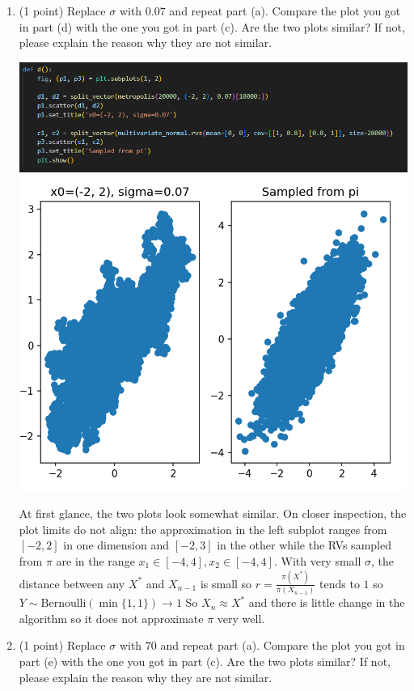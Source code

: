 \documentclass[11pt,letterpaper, leqno]{article}
\numberwithin{equation}{section}
\numberwithin{theorem}{section}
\numberwithin{lemma}{section}
\numberwithin{corollary}{section}
\numberwithin{definition}{section}
\numberwithin{proposition}{section}
\numberwithin{remark}{section}
\numberwithin{example}{section}
\begin{document}
\begin{enumerate}
\begin{enumerate}
    \pagebreak   
    \item (1 point) Replace $\sigma$ with $0.07$ and repeat part (a). Compare the plot you got in part (d) with the one you got in part (c). Are the two plots similar? If not, please explain the reason why they are not similar.
    
        \color{blue}
            \includegraphics[width=\textwidth]{Images/2. D code.png}
            \includegraphics{Images/2. D.png}

            At first glance, the two plots look somewhat similar. On closer inspection, the plot limits do not align: the approximation in the left subplot ranges from $[-2, 2]$ in one dimension and $[-2, 3]$ in the other while the RVs sampled from $\pi$ are in the range $x_1 \in [-4, 4], x_2 \in [-4, 4]$. With very small $\sigma$, the distance between any $X^*$ and $X_{n-1}$ is small so $r = \frac{\pi(X^*)}{\pi(X_{n-1})}$ tends to $1$ so $Y \sim \text{Bernoulli}(\min\{1, 1\}) \to 1$ So $X_n \approx X^*$ and there is little change in the algorithm so it does not approximate $\pi$ very well. 
        \color{black}

    \pagebreak
    \item (1 point) Replace $\sigma$ with $70$ and repeat part (a). Compare the plot you got in part (e) with the one you got in part (c). Are the two plots similar? If not, please explain the reason why they are not similar.
    

\end{enumerate}
\end{enumerate}
\end{document}
